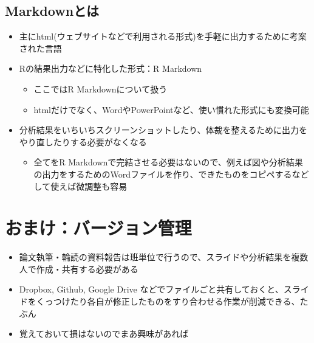 \documentclass[
]{ltjsarticle}
\providecommand{\tightlist}{%
  \setlength{\itemsep}{0pt}\setlength{\parskip}{0pt}}
\begin{document}
\hypertarget{markdownux3068ux306f}{%
\subsection{Markdownとは}\label{markdownux3068ux306f}}

\begin{itemize}
\tightlist
\item
  主にhtml(ウェブサイトなどで利用される形式)を手軽に出力するために考案された言語
\item
  Rの結果出力などに特化した形式：R Markdown

  \begin{itemize}
  \tightlist
  \item
    ここではR Markdownについて扱う
  \item
    htmlだけでなく、WordやPowerPointなど、使い慣れた形式にも変換可能
  \end{itemize}
\item
  分析結果をいちいちスクリーンショットしたり、体裁を整えるために出力をやり直したりする必要がなくなる

  \begin{itemize}
  \tightlist
  \item
    全てをR
    Markdownで完結させる必要はないので、例えば図や分析結果の出力をするためのWordファイルを作り、できたものをコピペするなどして使えば微調整も容易
  \end{itemize}
\end{itemize}

\hypertarget{ux304aux307eux3051ux30d0ux30fcux30b8ux30e7ux30f3ux7ba1ux7406}{%
\section{おまけ：バージョン管理}\label{ux304aux307eux3051ux30d0ux30fcux30b8ux30e7ux30f3ux7ba1ux7406}}

\begin{itemize}
\tightlist
\item
  論文執筆・輪読の資料報告は班単位で行うので、スライドや分析結果を複数人で作成・共有する必要がある
\item
  Dropbox, Github, Google Drive
  などでファイルごと共有しておくと、スライドをくっつけたり各自が修正したものをすり合わせる作業が削減できる、たぶん
\item
  覚えておいて損はないのでまあ興味があれば
\end{itemize}
\end{document}
